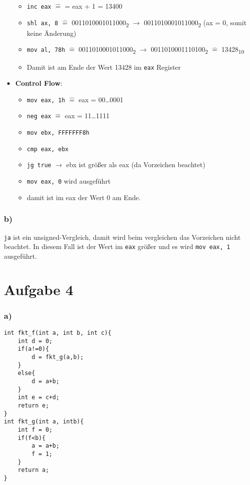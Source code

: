 \documentclass[]{scrreprt}
\begin{document}
\begin{itemize}
\begin{itemize}
			\item \texttt{inc eax} $\hat{=}$ = eax + 1 = 13400
			\item \texttt{shl ax, 8} $\hat{=}$ 0011010001011000\textsubscript{2} $\rightarrow$ 0011010001011000\textsubscript{2} (ax = 0, somit keine Änderung)
			\item  \texttt{mov al, 78h} $\hat{=}$ 0011010001011000\textsubscript{2} $\rightarrow$ 0011010001110100\textsubscript{2} $\hat{=}$ 13428\textsubscript{10}
			\item Damit ist am Ende der Wert 13428 im \texttt{eax} Register
		\end{itemize}
		
\item \textbf{Control Flow}:
\begin{itemize}
\item \texttt{mov eax, 1h} $\hat{=}$ eax = 00\dots0001
\item \texttt{neg eax} $\hat{=}$ eax = 11\dots1111
\item \texttt{mov ebx, FFFFFFF8h}
\item \texttt{cmp eax, ebx} 
\item \texttt{jg true} $\rightarrow$ ebx ist größer als eax (da Vorzeichen beachtet)
\item \texttt{mov eax, 0} wird ausgeführt
\item damit ist im eax der Wert 0 am Ende.
\end{itemize}
\end{itemize}
\subsection*{b)}
\texttt{ja} ist ein unsigned-Vergleich, damit wird beim vergleichen das Vorzeichen nicht beachtet. In diesem Fall ist der Wert im \texttt{eax} größer und es wird \texttt{mov eax, 1} ausgeführt.
\chapter{Aufgabe 4}
\subsection*{a)}
\begin{lstlisting}[caption={Funktionen f und g},captionpos=b]
int fkt_f(int a, int b, int c){
	int d = 0;
	if(a!=0){
		d = fkt_g(a,b);
	}
	else{
		d = a+b;
	}
	int e = c+d;
	return e;
}
int fkt_g(int a, intb){
	int f = 0;
	if(f<b){
		a = a+b;
		f = 1;
	}
	return a;
}
\end{lstlisting}
\end{document}
